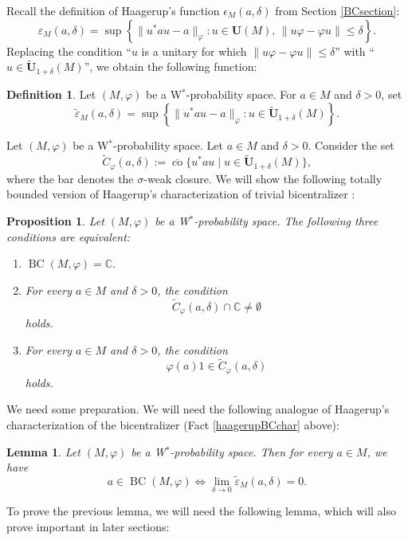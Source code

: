 \documentclass[12pt]{amsart}
\newtheorem{lem}[thm]{Lemma}
\newtheorem{prop}[thm]{Proposition}
\theoremstyle{definition}
\newtheorem{defn}[thm]{Definition}
\newcommand{\C}{\mathbb{C}}
\newcommand{\ep}{\varepsilon}
\def\BC{\operatorname{BC}}
\begin{document}
Recall the definition of Haagerup's function $\epsilon_M(a,\delta)$ from Section \ref{BCsection}: $$\ep_{M}(a,\delta)=\sup \left \{\|u^*au-a\|_{\varphi}\colon u\in \mathbf{U}(M),\,\|u\varphi-\varphi u\|\leq \delta\right \}.$$  Replacing the condition ``$u$ is a unitary for which $\|u\varphi-\varphi u\|\leq \delta$'' with ``$u\in \tilde{\mathbf{U}}_{1+\delta}(M)$'', we obtain the following function:
\begin{defn}
Let $(M,\varphi)$ be a W$^*$-probability space.  For $a\in M$ and $\delta>0$, set    
\[\tilde{\ep}_{M}(a,\delta)=\sup \left \{\|u^*au-a\|_{\varphi}\colon u\in \tilde{\mathbf{U}}_{1+\delta}(M)\right \}.\]
\end{defn}
Let $(M,\varphi)$ be a W$^*$-probability space. Let $a\in M$ and $\delta>0$. Consider the set 
$$\widetilde{C}_{\varphi}(a,\delta):=\overline{\operatorname{co}}\{u^*au\mid u\in \tilde{\mathbf{U}}_{1+\delta}(M)\},$$
where the bar denotes the $\sigma$-weak closure. 
We will show the following totally bounded version of Haagerup's characterization of trivial bicentralizer \cite[Proposition 1.3]{haagerup87}: 
\begin{prop}\label{prop tbprop1.3}
    Let $(M,\varphi)$ be a W$^*$-probability space. The following three conditions are equivalent: 
    \begin{enumerate}
    \item[(a)] $\BC(M,\varphi)=\mathbb{C}.$
    \item[(b)] For every $a\in M$ and $\delta>0$, the condition 
    $$\widetilde{C}_{\varphi}(a,\delta)\cap \C \neq \emptyset$$
    holds. 
    \item[(c)] For every $a\in M$ and $\delta>0$, the condition 
    $$\varphi (a)1\in \widetilde{C}_{\varphi}(a,\delta)$$
    holds.
  \end{enumerate}
\end{prop}
We need some preparation. We will need the following analogue of Haagerup's characterization of the bicentralizer (Fact \ref{haagerupBCchar} above):

\begin{lem}\label{lem tildeepsilon and BC}
    Let $(M,\varphi)$ be a W$^*$-probability space. Then for every $a\in M$, we have
    \[a\in \BC(M,\varphi)\iff \lim_{\delta\to 0}\tilde{\ep}_{M}(a,\delta)=0.\]
\end{lem}

To prove the previous lemma, we will need the following lemma, which will also prove important in later sections:
\end{document}
